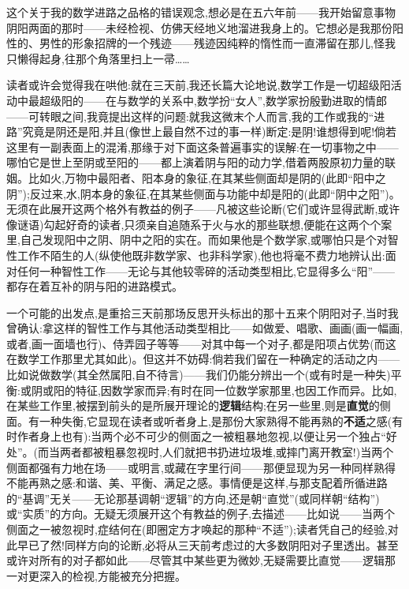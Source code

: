这个关于我的数学进路之品格的错误观念,想必是在五六年前——我开始留意事物阴阳两面的那时——未经检视、仿佛天经地义地溜进我身上的。它想必是我那份阳性的、男性的形象招牌的一个残迹——残迹因纯粹的惰性而一直滞留在那儿,怪我只懒得起身,往那个角落里扫上一帚……

读者或许会觉得我在哄他:就在三天前,我还长篇大论地说,数学工作是一切超级阳活动中最超级阳的——在与数学的关系中,数学扮“女人”,数学家扮殷勤进取的情郎——可转眼之间,我竟提出这样的问题:就我这微末个人而言,我的工作或我的“进路”究竟是阴还是阳,并且(像世上最自然不过的事一样)断定:是阴!谁想得到呢!倘若这里有一副表面上的混淆,那缘于对下面这条普遍事实的误解:在一切事物之中——哪怕它是世上至阴或至阳的——都上演着阴与阳的动力学,借着两股原初力量的联姻。比如火,万物中最阳者、阳本身的象征,在其某些侧面却是阴的(此即“阳中之阴”)\dmark{};反过来,水,阴本身的象征,在其某些侧面与功能中却是阳的(此即“阴中之阳”)。无须在此展开这两个格外有教益的例子——凡被这些论断(它们或许显得武断,或许像谜语)勾起好奇的读者,只须亲自追随系于火与水的那些联想,便能在这两个个案里,自己发现阳中之阴、阴中之阳的实在。而如果他是个数学家,或哪怕只是个对智性工作不陌生的人(纵使他既非数学家、也非科学家),他也将毫不费力地辨认出:面对任何一种智性工作——无论与其他较零碎的活动类型相比,它显得多么“阳”——都存在着互补的阴与阳的进路模式。

一个可能的出发点,是重拾三天前那场反思开头标出的那十五来个阴阳对子,当时我曾确认:拿这样的智性工作与其他活动类型相比——如做爱、唱歌、画画(画一幅画,或者,画一面墙也行)、侍弄园子等等——对其中每一个对子,都是阳项占优势(而这在数学工作那里尤其如此)。但这并不妨碍:倘若我们留在一种确定的活动之内——比如说做数学(其全然属阳,自不待言)——我们仍能分辨出一个(或有时是一种失)平衡:或阴或阳的特征,因数学家而异;有时在同一位数学家那里,也因工作而异。比如,在某些工作里,被摆到前头的是所展开理论的\textbf{逻辑}结构;在另一些里,则是\textbf{直觉}的侧面。有一种失衡,它显现在读者或听者身上,是那份大家熟得不能再熟的\textbf{不适}之感(有时作者身上也有):当两个必不可少的侧面之一被粗暴地忽视,以便让另一个独占“好处”。(而当两者都被粗暴忽视时,人们就把书扔进垃圾堆,或摔门离开教室!)当两个侧面都强有力地在场——或明言,或藏在字里行间——那便显现为另一种同样熟得不能再熟之感:和谐、美、平衡、满足之感。事情便是这样,与那支配着所循进路的“基调\dmark{}”无关——无论那基调朝“逻辑”的方向,还是朝“直觉”(或同样朝“结构”)或“实质”的方向。无疑无须展开这个有教益的例子,去描述——比如说——当两个侧面之一被忽视时,症结何在(即圈定方才唤起的那种“不适”);读者凭自己的经验,对此早已了然!同样方向的论断,必将从三天前考虑过的大多数阴阳对子里透出。甚至或许对所有的对子都如此——尽管其中某些更为微妙,无疑需要比直觉——逻辑那一对更深入的检视,方能被充分把握。

